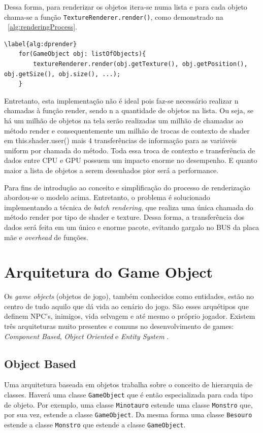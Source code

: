 \documentclass[12pt, 
openright, 
oneside, 
a4paper,    
brazil]{facom-ufu-abntex2}
\begin{document}
Dessa forma, para renderizar os objetos itera-se numa lista e para cada objeto chama-se a função \texttt{TextureRenderer.render()}, como demonstrado na \lstlistingname~\ref{alg:renderingProcess}.

\begin{lstlisting}[caption=Demonstração do processo de renderização, label={alg:renderingProcess}]
\label{alg:dprender}
	for(GameObject obj: listOfObjects){
		textureRenderer.render(obj.getTexture(), obj.getPosition(), obj.getSize(), obj.size(), ...);
	}
\end{lstlisting}

Entretanto, esta implementação não é ideal pois faz-se necessário realizar n chamadas à função render, sendo n a quantidade de objetos na lista. Ou seja, se há um milhão de objetos na tela serão realizadas um milhão de chamadas ao método render e consequentemente um milhão de trocas de contexto de shader em this.shader.user() mais 4 transferências de informação para as variáveis uniform por chamada do método. Toda essa troca de contexto e transferência de dados entre CPU e GPU possuem um impacto enorme no desempenho. E quanto maior a lista de objetos a serem desenhados pior será a performance.

Para fins de introdução ao conceito e simplificação do processo de renderização abordou-se o modelo acima. Entretanto, o problema é solucionado implementando a técnica de \textit{batch rendering}, que realiza uma única chamada do método render por tipo de shader e texture. Dessa forma, a transferência dos dados será feita em um único e enorme pacote, evitando gargalo no BUS da placa mãe e \textit{overhead} de funções.

\section{Arquitetura do Game Object}

Os \textit{game objects} (objetos de jogo), também conhecidos como entidades, estão no centro de tudo aquilo que dá vida ao cenário do jogo. São esses arquétipos que definem NPC's, inimigos, vida selvagem e até mesmo o próprio jogador. Existem três arquiteturas muito presentes e comuns no desenvolvimento de games: \textit{Component Based}, \textit{Object Oriented} e \textit{Entity System} \cite{GameObjectArchitecture}. 

\subsection{Object Based}
Uma arquitetura baseada em objetos trabalha sobre o conceito de hierarquia de classes. Haverá uma classe \texttt{GameObject} que é então especializada para cada tipo de objeto. Por exemplo, uma classe \texttt{Minotauro} estende uma classe \texttt{Monstro} que, por sua vez, estende a classe \texttt{GameObject}. Da mesma forma uma classe \texttt{Besouro} estende a classe \texttt{Monstro} que estende a classe \texttt{GameObject}.
\end{document}
